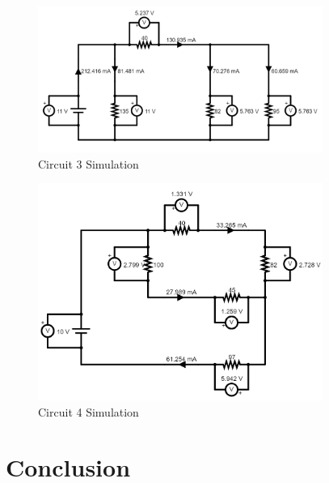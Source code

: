 \documentclass[12pt]{iopart} %
\begin{document}
\begin{figure}[htbp]
  \begin{indented}
  \item[]\includegraphics[width=0.83\textwidth]{circuit-3-simulation.png}
  \end{indented}
  \caption{\label{fig:circuit_3_simulation}
  Circuit 3 Simulation
  }
\end{figure}

\begin{figure}[htbp]
  \begin{indented}
  \item[]\includegraphics[width=0.83\textwidth]{circuit-4-simulation.png}
  \end{indented}
  \caption{\label{fig:circuit_4_simulation}
  Circuit 4 Simulation
  }
\end{figure}

\clearpage

\section{Conclusion}

\end{document}

